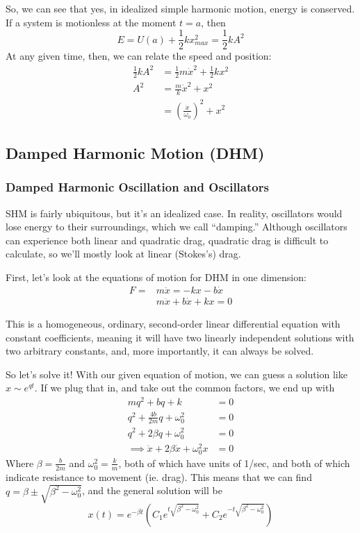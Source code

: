 \documentclass[a4paper]{article}
\begin{document}
So, we can see that yes, in idealized simple harmonic motion, energy is
conserved. If a system is motionless at the moment $t=a$, then
\[E = U(a)+\frac{1}{2}kx_{max}^2 = \frac{1}{2}kA^2\]
At any given time, then, we can relate the speed and position:
\begin{align*}
	\frac{1}{2}kA^2 &= \frac{1}{2}m\dot{x}^2+\frac{1}{2}kx^2\\
	A^2&=\frac{m}{k}\dot{x}^2+x^2\\
	   &= \left(\frac{\dot{x}}{\omega_0}\right)^2+x^2
\end{align*}


\subsection{Damped Harmonic Motion (DHM)}
\subsubsection{Damped Harmonic Oscillation and Oscillators}
SHM is fairly ubiquitous, but it's an idealized case. In reality, oscillators
would lose energy to their surroundings, which we call ``damping.'' Although
oscillators can experience both linear and quadratic drag, quadratic drag is
difficult to calculate, so we'll mostly look at linear (Stokes's) drag.

First, let's look at the equations of motion for DHM in one dimension:
\begin{align*}
	F = &m\ddot{x} = -kx-b\dot{x}\\
	    &m\ddot{x}+b\dot{x}+kx=0
\end{align*}

This is a homogeneous, ordinary, second-order linear differential equation with
constant coefficients, meaning it will have two linearly independent solutions
with two arbitrary constants, and, more importantly, it can always be solved.

So let's solve it! With our given equation of motion, we can guess a solution
like $x\sim e^{qt}$. If we plug that in, and take out the common factors,
we end up with
\begin{align*}
	mq^2+bq+k&=0\\
	q^2+\frac{4b}{2m}q+\omega_0^2&=0\\
	q^2+2\beta q + \omega_0^2&=0\\
	\implies\ddot{x}+2\beta\dot{x}+\omega_0^2x&=0
\end{align*}
Where $\beta = \frac{b}{2m}$ and $\omega_0^2 = \frac{k}{m}$, both of which have
units of 1/sec, and both of which indicate resistance to movement (ie. drag).
This means that we can find $q = \beta\pm\sqrt{\beta^2-\omega_0^2}$, and
the general solution will be
\[
	x(t) = e^{-\beta t}\left(C_1e^{t\sqrt{\beta^2-\omega_0^2}} +
	C_2e^{-t\sqrt{\beta^2-\omega_0^2}}\right)
\]
\end{document}
